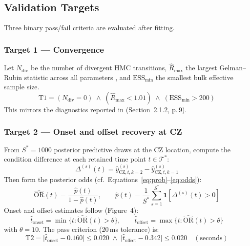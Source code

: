 \documentclass[12pt, a4paper]{article}
\begin{document}
\subsection{Validation Targets}\label{sec:targets}

Three binary pass/fail criteria are evaluated after fitting.

\subsubsection*{Target 1 --- Convergence}

Let $N_\text{div}$ be the number of divergent HMC transitions,
$\hat{R}_\text{max}$ the largest Gelman--Rubin statistic across all
parameters \citep{Vehtari2021}, and $\text{ESS}_\text{min}$ the smallest
bulk effective sample size.
\begin{equation}\label{eq:t1}
  \text{T1} = (N_\text{div} = 0)
              \;\wedge\; (\hat{R}_\text{max} < 1.01)
              \;\wedge\; (\text{ESS}_\text{min} > 200)
\end{equation}
This mirrors the diagnostics reported in \citet{Nalborczyk2025}
(Section~2.1.2, p.\,9).

\subsubsection*{Target 2 --- Onset and offset recovery at CZ}

From $S^* = 1000$ posterior predictive draws at the CZ location, compute
the condition difference at each retained time point $t \in \mathcal{T}^*$:
\begin{equation}
  \Delta^{(s)}(t)
    = \hat{y}^{(s)}_{\text{CZ},t,k=2}
    - \hat{y}^{(s)}_{\text{CZ},t,k=1}
\end{equation}
Then form the posterior odds (cf.\ Equations~\ref{eq:prob}--\ref{eq:odds}):
\begin{equation}
  \widehat{\mathrm{OR}}(t)
    = \frac{\hat{p}(t)}{1 - \hat{p}(t)},
  \qquad
  \hat{p}(t) = \frac{1}{S^*}\sum_{s=1}^{S^*}\mathbf{1}[\Delta^{(s)}(t)>0]
\end{equation}
Onset and offset estimates follow \citet{Nalborczyk2025} (Figure~4):
\begin{equation}
  \hat{t}_\text{onset}  = \min\bigl\{t : \widehat{\mathrm{OR}}(t) > \theta\bigr\},
  \qquad
  \hat{t}_\text{offset} = \max\bigl\{t : \widehat{\mathrm{OR}}(t) > \theta\bigr\}
\end{equation}
with $\theta = 10$.
The pass criterion (20\,ms tolerance) is:
\begin{equation}\label{eq:t2}
  \text{T2} =
    \bigl|\hat{t}_\text{onset}  - 0.160\bigr| \le 0.020
  \;\wedge\;
  \bigl|\hat{t}_\text{offset} - 0.342\bigr| \le 0.020
  \quad (\text{seconds})
\end{equation}
\end{document}
